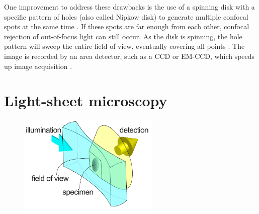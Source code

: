     

    One improvement to address these drawbacks is the use of a spinning disk with a specific pattern of holes (also called Nipkow disk) to generate multiple confocal spots at the same time \cite{graf_live_2005}. If these spots are far enough from each other, confocal rejection of out-of-focus light can still occur. As the disk is spinning, the hole pattern will sweep the entire field of view, eventually covering all points \cite{kino_intermediate_1990}. The image is recorded by an area detector, such as a CCD or EM-CCD, which speeds up image acquisition \cite{nakano_spinning-disk_2002}.

    




\section{Light-sheet microscopy}
  \label{sec:light-sheet}
  \begin{figure}[bt]
    \centering
    \includegraphics[width=0.6\textwidth]{spim_concept}
    \label{fig:spim_concept}
  \end{figure}

